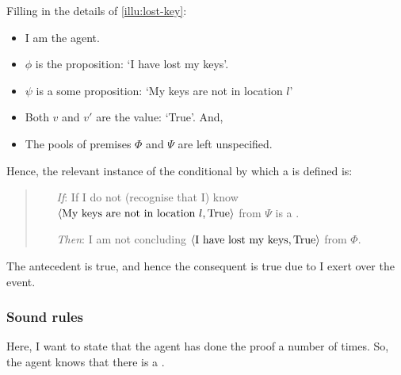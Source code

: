 \begin{note}
  Filling in the details of \autoref{illu:lost-key}:
  \begin{itemize}[noitemsep]
  \item
    I am the agent.
  \item
    \(\phi\) is the proposition: `I have lost my keys'.
  \item
    \(\psi\) is a some proposition: `My keys are not in location \(l\)'
  \item
    Both \(v\) and \(v'\) are the value: `True'.
    And,
  \item
    The pools of premises \(\Phi\) and \(\Psi\) are left unspecified.
  \end{itemize}

  Hence, the relevant instance of the conditional by which a \requ{} is defined is:

  \begin{quote}
    \begin{itemize}
    \item[\emph{If}:]
      If I do not (recognise that I) know \(\langle \text{My keys are not in location }l, \text{True} \rangle\) from \(\Psi\) is a \fc{}.
    \item[\emph{Then}:]
      I am not concluding \(\langle \text{I have lost my keys}, \text{True} \rangle\) from \(\Phi\).
    \end{itemize}
  \end{quote}

  The antecedent is true, and hence the consequent is true due to \ninf{} I exert over the event.
\end{note}

\subsubsection{Sound rules}

\begin{note}
  Here, I want to state that the agent has done the proof a number of times.
  So, the agent knows that there is a \pevent{}.
\end{note}

